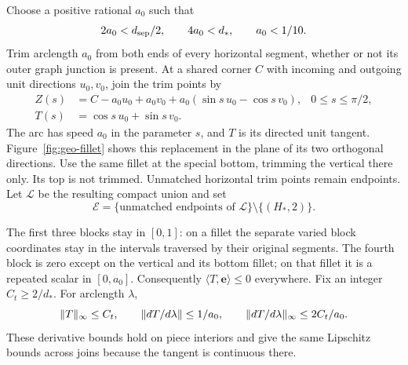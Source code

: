 Choose a positive rational $a_0$ such that
\begin{equation}\label{geo:trim-choice}
 2a_0<d_{\rm sep}/2,\qquad4a_0<d_*,\qquad a_0<1/10.
\end{equation}
Trim arclength $a_0$ from both ends of every horizontal segment, whether
or not its outer graph junction is present. At a shared corner $C$ with
incoming and outgoing unit directions $u_0,v_0$, join the trim points by
\begin{align}
 Z(s)&=C-a_0u_0+a_0v_0
             +a_0(\sin s\,u_0-\cos s\,v_0),
             &0\le s\le\pi/2,\label{geo:fillet}\\
 T(s)&=\cos s\,u_0+\sin s\,v_0.\label{geo:fillet-tangent}
\end{align}
The arc has speed $a_0$ in the parameter $s$, and $T$ is its directed
unit tangent. Figure~\ref{fig:geo-fillet} shows this replacement in the
plane of its two orthogonal directions. Use the same fillet at the special
bottom, trimming the vertical there only. Its top is not trimmed. Unmatched horizontal trim
points remain endpoints. Let $\mathcal L$ be the resulting compact union
and set
\begin{equation}\label{geo:endpoint-set}
 \mathcal E=\{\text{unmatched endpoints of }\mathcal L\}
                \setminus\{(H_*,2)\}.
\end{equation}

The first three blocks stay in $[0,1]$: on a fillet the separate varied
block coordinates stay in the intervals traversed by their original
segments. The fourth block is zero except on the vertical and its bottom
fillet; on that fillet it is a repeated scalar in $[0,a_0]$.
Consequently $\langle T,\mathbf e\rangle\le0$ everywhere. Fix an
integer $C_t\ge2/d_*$. For arclength $\lambda$,
\begin{equation}\label{geo:tangent-bounds}
 \lVert T\rVert_\infty\le C_t,\qquad
 \lVert dT/d\lambda\rVert\le1/a_0,\qquad
 \lVert dT/d\lambda\rVert_\infty\le2C_t/a_0.
\end{equation}
These derivative bounds hold on piece interiors and give the same
Lipschitz bounds across joins because the tangent is continuous there.

